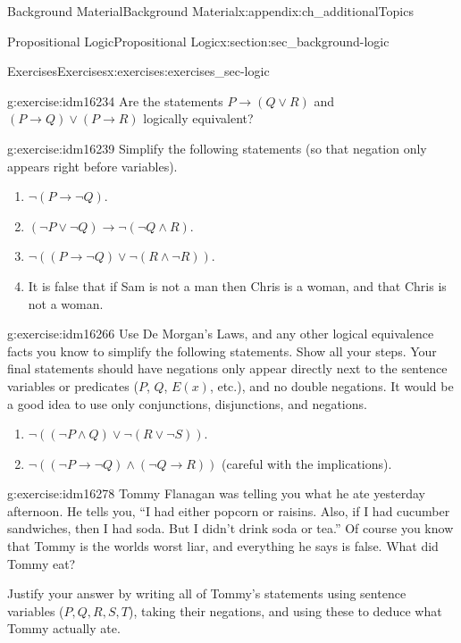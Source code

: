 \documentclass[oneside,10pt,]{book}
\numberwithin{equation}{chapter}
\def\imp{\rightarrow}
\begin{document}
\begin{appendixptx}{Background Material}{}{Background Material}{}{}{x:appendix:ch_additionalTopics}
\begin{sectionptx}{Propositional Logic}{}{Propositional Logic}{}{}{x:section:sec_background-logic}
\begin{exercises-subsection}{Exercises}{}{Exercises}{}{}{x:exercises:exercises_sec-logic}
\begin{divisionexercise}{6}{}{}{g:exercise:idm16234}
Are the statements \(P \imp (Q\vee R)\) and \((P \imp Q) \vee (P \imp R)\) logically equivalent?%
\end{divisionexercise}%
\begin{divisionexercise}{7}{}{}{g:exercise:idm16239}%
Simplify the following statements (so that negation only appears right before variables).%
\par
%
\begin{enumerate}[label=(\alph*)]
\item{}\(\neg(P \imp \neg Q)\).%
\item{}\((\neg P \vee \neg Q) \imp \neg (\neg Q \wedge R)\).%
\item{}\(\neg((P \imp \neg Q) \vee \neg (R \wedge \neg R))\).%
\item{}It is false that if Sam is not a man then Chris is a woman, and that Chris is not a woman.%
\end{enumerate}
%
\end{divisionexercise}%
\begin{divisionexercise}{8}{}{}{g:exercise:idm16266}%
Use De Morgan's Laws, and any other logical equivalence facts you know to simplify the following statements. Show all your steps. Your final statements should have negations only appear directly next to the sentence variables or predicates (\(P\), \(Q\), \(E(x)\), etc.), and no double negations. It would be a good idea to use only conjunctions, disjunctions, and negations.%
\par
%
\begin{enumerate}[label=(\alph*)]
\item{}\(\neg((\neg P \wedge Q) \vee \neg(R \vee \neg S))\). %
\item{}\(\neg((\neg P \imp \neg Q) \wedge (\neg Q \imp R))\) (careful with the implications). %
\end{enumerate}
%
\end{divisionexercise}%
\begin{divisionexercise}{9}{}{}{g:exercise:idm16278}%
Tommy Flanagan was telling you what he ate yesterday afternoon. He tells you, ``I had either popcorn or raisins. Also, if I had cucumber sandwiches, then I had soda. But I didn't drink soda or tea.'' Of course you know that Tommy is the worlds worst liar, and everything he says is false. What did Tommy eat?%
\par
Justify your answer by writing all of Tommy's statements using sentence variables (\(P, Q, R, S, T\)), taking their negations, and using these to deduce what Tommy actually ate.%
\end{divisionexercise}%

\end{exercises-subsection}
\end{sectionptx}
\end{appendixptx}
\end{document}
